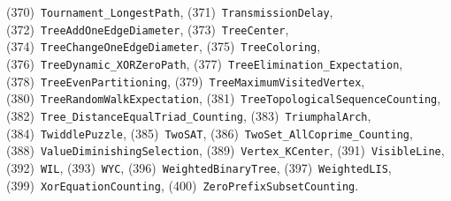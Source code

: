 \documentclass{article}
\theoremstyle{plain}
\theoremstyle{definition}
\theoremstyle{remark}
\begin{document}
\begin{flushleft}
(370)~\texttt{Tournament\_LongestPath},
(371)~\texttt{TransmissionDelay},
(372)~\texttt{TreeAddOneEdgeDiameter},
(373)~\texttt{TreeCenter},
(374)~\texttt{TreeChangeOneEdgeDiameter},
(375)~\texttt{TreeColoring},
(376)~\texttt{TreeDynamic\_XORZeroPath},
(377)~\texttt{TreeElimination\_Expectation},
(378)~\texttt{TreeEvenPartitioning},
(379)~\texttt{TreeMaximumVisitedVertex},
(380)~\texttt{TreeRandomWalkExpectation},
(381)~\texttt{TreeTopologicalSequenceCounting},
(382)~\texttt{Tree\_DistanceEqualTriad\_Counting},
(383)~\texttt{TriumphalArch},
(384)~\texttt{TwiddlePuzzle},
(385)~\texttt{TwoSAT},
(386)~\texttt{TwoSet\_AllCoprime\_Counting},
(388)~\texttt{ValueDiminishingSelection},
(389)~\texttt{Vertex\_KCenter},
(391)~\texttt{VisibleLine},
(392)~\texttt{WIL},
(393)~\texttt{WYC},
(396)~\texttt{WeightedBinaryTree},
(397)~\texttt{WeightedLIS},
(399)~\texttt{XorEquationCounting},
(400)~\texttt{ZeroPrefixSubsetCounting}.
\end{flushleft}
\end{document}
